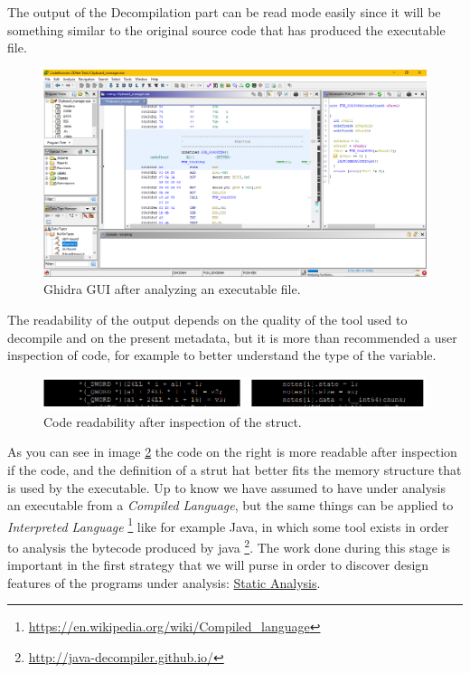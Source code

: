 \documentclass{article}
\begin{document}
The output of the Decompilation part can be read mode easily since it will be something similar to the original source code that has produced the executable file. 
\begin{figure}[htp]
    \centering
    \includegraphics[width=1\textwidth]{images/ghidra.png}
    \caption{Ghidra GUI after analyzing an executable file.}
    \label{fig:ghidraoutput}
\end{figure}
The readability of the output depends on the quality of the tool used to decompile and on the present metadata, but it is more than recommended a user inspection of code, for example to better understand the type of the variable.
\begin{figure}[htp]
    \centering
    \includegraphics[width=1\textwidth]{images/coderead.png}
    \caption{Code readability after inspection of the struct.}
    \label{fig:coderead}
\end{figure}
As you can see in image \ref{fig:coderead} the code on the right is more readable after inspection if the code, and the definition of a strut hat better fits the memory structure that is used by the executable.
Up to know we have assumed to have under analysis an executable from a \textit{Compiled Language}, but the same things can be applied to \textit{Interpreted Language} \footnote{\url{https://en.wikipedia.org/wiki/Compiled_language}} like for example Java, in which some tool exists in order to analysis the bytecode produced by java \footnote{\url{http://java-decompiler.github.io/}}.
The work done during this stage is important in the first strategy that we will purse in order to discover design features of the programs under analysis: \underline{Static Analysis}.
\end{document}
